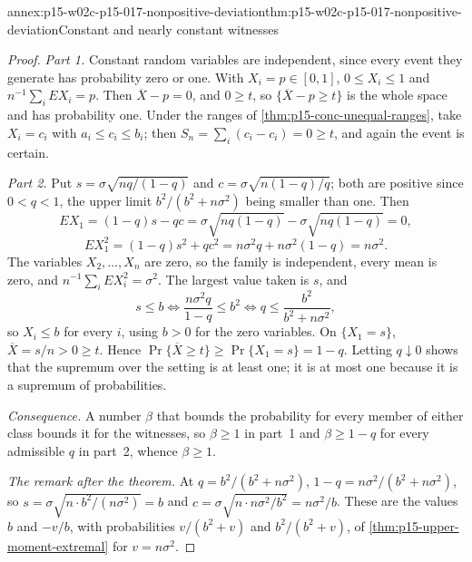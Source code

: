 \begin{annexitem}{annex:p15-w02c-p15-017-nonpositive-deviation}{thm:p15-w02c-p15-017-nonpositive-deviation}{Constant and nearly constant witnesses}
\begin{proof}
\emph{Part 1.} Constant random variables are independent, since every
event they generate has probability zero or one. With \(X_i=p\in[0,1]\),
\(0\leq X_i\leq1\) and \(n^{-1}\sum_iEX_i=p\). Then \(\overline X-p=0\),
and \(0\geq t\), so \(\{\overline X-p\geq t\}\) is the whole space and has
probability one. Under the ranges of \cref{thm:p15-conc-unequal-ranges},
take \(X_i=c_i\) with \(a_i\leq c_i\leq b_i\); then
\(S_n=\sum_i(c_i-c_i)=0\geq t\), and again the event is certain.

\emph{Part 2.} Put \(s=\sigma\sqrt{nq/(1-q)}\) and
\(c=\sigma\sqrt{n(1-q)/q}\); both are positive since \(0<q<1\), the upper
limit \(b^2/(b^2+n\sigma^2)\) being smaller than one. Then
\[
 EX_1=(1-q)s-qc=\sigma\sqrt{nq(1-q)}-\sigma\sqrt{nq(1-q)}=0,
\]
\[
 EX_1^2=(1-q)s^2+qc^2=n\sigma^2q+n\sigma^2(1-q)=n\sigma^2 .
\]
The variables \(X_2,\ldots,X_n\) are zero, so the family is independent,
every mean is zero, and \(n^{-1}\sum_iEX_i^2=\sigma^2\). The largest value
taken is \(s\), and
\[
 s\leq b\iff\frac{n\sigma^2q}{1-q}\leq b^2\iff q\leq\frac{b^2}{b^2+n\sigma^2},
\]
so \(X_i\leq b\) for every \(i\), using \(b>0\) for the zero variables.
On \(\{X_1=s\}\), \(\overline X=s/n>0\geq t\). Hence
\(\Pr\{\overline X\geq t\}\geq\Pr\{X_1=s\}=1-q\). Letting
\(q\downarrow0\) shows that the supremum over the setting is at least
one; it is at most one because it is a supremum of probabilities.

\emph{Consequence.} A number \(\beta\) that bounds the probability for
every member of either class bounds it for the witnesses, so
\(\beta\geq1\) in part~1 and \(\beta\geq1-q\) for every admissible \(q\)
in part~2, whence \(\beta\geq1\).

\emph{The remark after the theorem.} At \(q=b^2/(b^2+n\sigma^2)\),
\(1-q=n\sigma^2/(b^2+n\sigma^2)\), so \(s=\sigma\sqrt{n\cdot b^2/(n\sigma^2)}=b\)
and \(c=\sigma\sqrt{n\cdot n\sigma^2/b^2}=n\sigma^2/b\). These are the
values \(b\) and \(-v/b\), with probabilities \(v/(b^2+v)\) and
\(b^2/(b^2+v)\), of \cref{thm:p15-upper-moment-extremal} for
\(v=n\sigma^2\).
\end{proof}
\end{annexitem}


